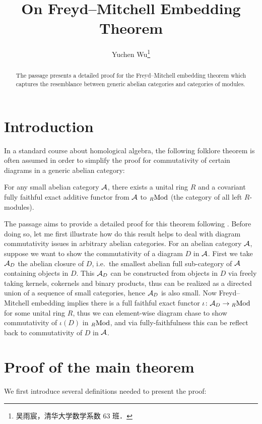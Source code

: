 \documentclass[twoside]{article}
\begin{document}
\title{On Freyd--Mitchell Embedding Theorem}
\author{Yuchen Wu\footnote{吴雨宸，清华大学数学系数 63 班．}}

\begin{abstract}
The passage presents a detailed proof for the Freyd--Mitchell embedding theorem which captures the resemblance between generic abelian categories and categories of modules.
\end{abstract}


\section{Introduction}

In a standard course about homological algebra, the following folklore theorem is often assumed in order to simplify the proof for commutativity of certain diagrams in a generic abelian category:
\begin{thm} \label{FE} For any small abelian category ${\mathcal{A}}$, there exists a unital ring $R$ and a covariant fully faithful exact additive functor from ${\mathcal{A}}$ to ${}_R\mathrm{Mod}$ (the category of all left $R$-modules).
\end{thm}

The passage aims to provide a detailed proof for this theorem following \cite{Fre64}. Before doing so, let me first illustrate how do this result helps to deal with diagram commutativity issues in arbitrary abelian categories. For an abelian category ${\mathcal{A}}$, suppose we want to show the commutativity of a diagram $D$ in ${\mathcal{A}}$. First we take ${\mathcal{A}}_D$ the abelian closure of $D$, i.e.\ the smallest abelian full sub-category of ${\mathcal{A}}$ containing objects in $D$. This ${\mathcal{A}}_D$ can be constructed from objects in $D$ via freely taking kernels, cokernels and binary products, thus can be realized as a directed union of a sequence of small categories, hence ${\mathcal{A}}_D$ is also small. Now Freyd--Mitchell embedding implies there is a full faithful exact functor $\iota\colon {\mathcal{A}}_D \rightarrow {}_R\mathrm{Mod}$ for some unital ring $R$, thus we can element-wise diagram chase to show commutativity of $\iota(D)$ in ${}_R\mathrm{Mod}$, and via fully-faithfulness this can be reflect back to commutativity of $D$ in ${\mathcal{A}}$.

\section{Proof of the main theorem}

We first introduce several definitions needed to present the proof:
\end{document}
